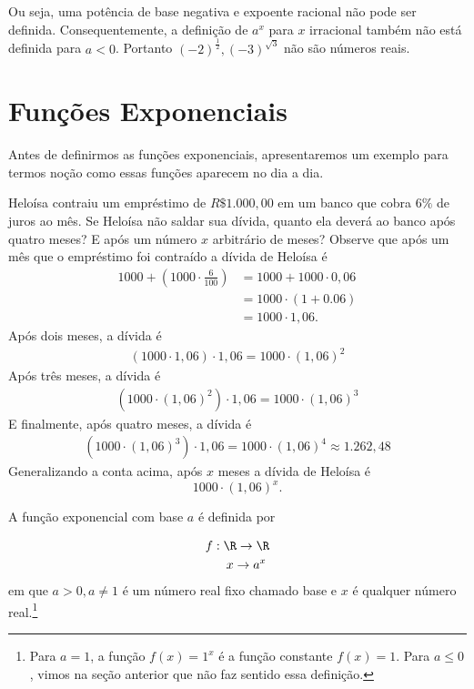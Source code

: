 Ou seja, uma potência de base negativa e expoente racional não pode ser definida. Consequentemente, a definição de $a^x$ para $x$ irracional também não está definida para $a<0$.
Portanto $(-2)^{\frac{1}{2}},(-3)^{\sqrt{3}}$ não são números reais.


\section{Funções Exponenciais}

Antes de definirmos as funções exponenciais, apresentaremos um exemplo para termos noção como essas funções aparecem no dia a dia.

\begin{exe}
	\label{ex 1}
	Heloísa contraiu um empréstimo de $R\$1.000,00$ em um banco que cobra $6\%$ de juros ao mês. Se Heloísa não saldar sua dívida, quanto ela deverá ao banco após quatro meses? E após um número $x$ arbitrário de meses?
	\color{red}
	Observe que após um mês que o empréstimo foi contraído a dívida de Heloísa é
	\begin{align*}
	1000+(1000\cdot \frac{6}{100})&=1000+1000\cdot 0,06\\
	&=1000\cdot(1+0.06)\\
	&=1000\cdot 1,06.
	\end{align*}
	Após dois meses, a dívida é
\begin{align*}
(1000\cdot 1,06)\cdot 1,06 = 1000 \cdot (1,06)^2
\end{align*}
		Após três meses, a dívida é
	\begin{align*}
	(1000\cdot (1,06)^2)\cdot 1,06 = 1000 \cdot (1,06)^3
	\end{align*}
		E finalmente, após quatro meses, a dívida é
	\begin{align*}
	(1000\cdot (1,06)^3)\cdot 1,06 = 1000 \cdot (1,06)^4\approx 1.262,48
	\end{align*}
	Generalizando a conta acima, após $x$ meses a dívida de Heloísa é
	\[1000 \cdot (1,06)^x.\]
\color{black}
\end{exe}

\begin{defin}
\label{def:exp:1}
A função exponencial com  base $a$ é definida por

\begin{align}
&f:\R\rightarrow\R \nonumber \\
&~~~~~ x\rightarrow a^x
\end{align}
em que $a>0, a\neq 1$ é um número real fixo chamado base e $x$ é qualquer número real.\footnote{Para $a=1$, a função $f(x)=1^x$ é a função constante $f(x)=1$. Para $a\leq 0$, vimos na seção anterior que não faz sentido essa definição.}
\end{defin}

